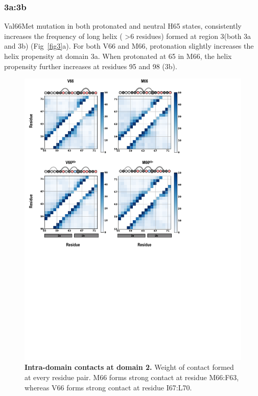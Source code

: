 \documentclass[journal=jacsat,manuscript=article]{achemso}
\begin{document}
 
\subsubsection{3a:3b}
Val66Met mutation in both protonated and neutral H65 states, consistently increases the frequency of long helix ( \textgreater 6 residues) formed at region 3(both 3a and 3b) (Fig~\ref{fig3}a). 
For both V66 and M66, protonation slightly increases the helix propensity at domain 3a. 
When protonated at 65 in M66, the helix propensity further increases at residues 95 and 98 (3b).

\begin{figure}[!ht]
\includegraphics[scale=0.5,width=12cm,trim={0 0cm 0 0cm},clip]{../figures/fig-3-1.pdf}

\caption{{\bf Intra-domain contacts at domain 2.}
Weight of contact formed at every residue pair. M66 forms strong contact at residue M66:F63, whereas V66 forms strong contact at residue I67:L70.}
\label{fig5} 
\end{figure}
\end{document}
